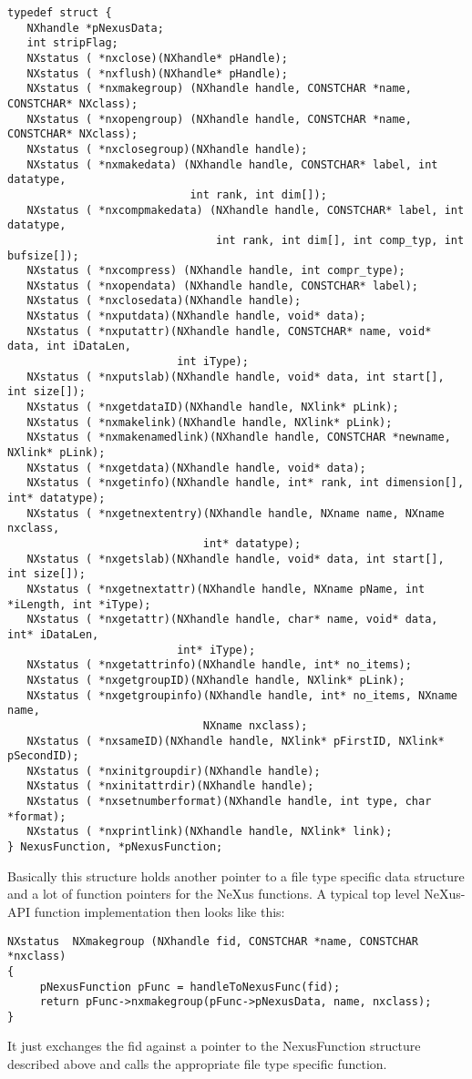 \documentclass[a4paper]{article}
\begin{document}
\begin{verbatim}
typedef struct {
   NXhandle *pNexusData;   
   int stripFlag;
   NXstatus ( *nxclose)(NXhandle* pHandle);
   NXstatus ( *nxflush)(NXhandle* pHandle);
   NXstatus ( *nxmakegroup) (NXhandle handle, CONSTCHAR *name, CONSTCHAR* NXclass);
   NXstatus ( *nxopengroup) (NXhandle handle, CONSTCHAR *name, CONSTCHAR* NXclass);
   NXstatus ( *nxclosegroup)(NXhandle handle);
   NXstatus ( *nxmakedata) (NXhandle handle, CONSTCHAR* label, int datatype, 
                            int rank, int dim[]);
   NXstatus ( *nxcompmakedata) (NXhandle handle, CONSTCHAR* label, int datatype, 
                                int rank, int dim[], int comp_typ, int bufsize[]);
   NXstatus ( *nxcompress) (NXhandle handle, int compr_type);
   NXstatus ( *nxopendata) (NXhandle handle, CONSTCHAR* label);
   NXstatus ( *nxclosedata)(NXhandle handle);
   NXstatus ( *nxputdata)(NXhandle handle, void* data);
   NXstatus ( *nxputattr)(NXhandle handle, CONSTCHAR* name, void* data, int iDataLen, 
                          int iType);
   NXstatus ( *nxputslab)(NXhandle handle, void* data, int start[], int size[]);    
   NXstatus ( *nxgetdataID)(NXhandle handle, NXlink* pLink);
   NXstatus ( *nxmakelink)(NXhandle handle, NXlink* pLink);
   NXstatus ( *nxmakenamedlink)(NXhandle handle, CONSTCHAR *newname, NXlink* pLink);
   NXstatus ( *nxgetdata)(NXhandle handle, void* data);
   NXstatus ( *nxgetinfo)(NXhandle handle, int* rank, int dimension[], int* datatype);
   NXstatus ( *nxgetnextentry)(NXhandle handle, NXname name, NXname nxclass, 
                              int* datatype);
   NXstatus ( *nxgetslab)(NXhandle handle, void* data, int start[], int size[]);
   NXstatus ( *nxgetnextattr)(NXhandle handle, NXname pName, int *iLength, int *iType);
   NXstatus ( *nxgetattr)(NXhandle handle, char* name, void* data, int* iDataLen, 
                          int* iType);
   NXstatus ( *nxgetattrinfo)(NXhandle handle, int* no_items);
   NXstatus ( *nxgetgroupID)(NXhandle handle, NXlink* pLink);
   NXstatus ( *nxgetgroupinfo)(NXhandle handle, int* no_items, NXname name, 
                              NXname nxclass);
   NXstatus ( *nxsameID)(NXhandle handle, NXlink* pFirstID, NXlink* pSecondID);
   NXstatus ( *nxinitgroupdir)(NXhandle handle);
   NXstatus ( *nxinitattrdir)(NXhandle handle);
   NXstatus ( *nxsetnumberformat)(NXhandle handle, int type, char *format);
   NXstatus ( *nxprintlink)(NXhandle handle, NXlink* link);
} NexusFunction, *pNexusFunction;
\end{verbatim}
Basically this structure holds another pointer to a file type specific data structure and a 
lot of function pointers for the NeXus functions. A typical top level NeXus-API function 
implementation then looks like this:
\begin{verbatim}
NXstatus  NXmakegroup (NXhandle fid, CONSTCHAR *name, CONSTCHAR *nxclass) 
{
     pNexusFunction pFunc = handleToNexusFunc(fid);
     return pFunc->nxmakegroup(pFunc->pNexusData, name, nxclass);   
}
\end{verbatim}
It just exchanges the fid against a pointer to the NexusFunction structure described above and 
calls the appropriate file type specific function.   
\end{document}
